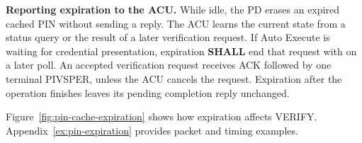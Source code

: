 \textbf{Reporting expiration to the ACU.}
While idle, the PD erases an expired cached PIN without sending a reply.
The ACU learns the current
state from a status query or the result of a later verification request.
If Auto Execute is waiting for credential presentation, expiration
\textbf{SHALL} end that request with  on a later poll.
An accepted verification request receives ACK followed by one terminal
PIVSPER, unless the ACU cancels the request. Expiration after the operation
finishes leaves its pending completion reply unchanged.

Figure~\ref{fig:pin-cache-expiration} shows how expiration affects VERIFY.
Appendix~\ref{ex:pin-expiration} provides packet and timing examples.

